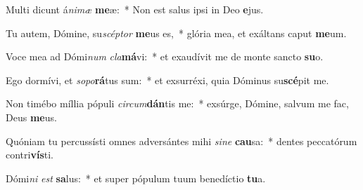 \item Multi dicunt á\textit{ni}\textit{mæ} \textbf{me}æ:~* Non est salus ipsi in Deo \textbf{e}jus.
\item Tu autem, Dómine, su\textit{scép}\textit{tor} \textbf{me}us es,~* glória mea, et exáltans caput \textbf{me}um.
\item Voce mea ad Dómi\textit{num} \textit{cla}\textbf{má}vi:~* et exaudívit me de monte sancto \textbf{su}o.
\item Ego dormívi, et \textit{so}\textit{po}\textbf{rá}tus sum:~* et exsurréxi, quia Dóminus su\textbf{scé}pit me.
\item Non timébo míllia pópuli \textit{cir}\textit{cum}\textbf{dán}tis me:~* exsúrge, Dómine, salvum me fac, Deus \textbf{me}us.
\item Quóniam tu percussísti omnes adversántes mihi \textit{si}\textit{ne} \textbf{cau}sa:~* dentes peccatórum contri\textbf{vís}ti.
\item Dómi\textit{ni} \textit{est} \textbf{sa}lus:~* et super pópulum tuum benedíctio \textbf{tu}a.
